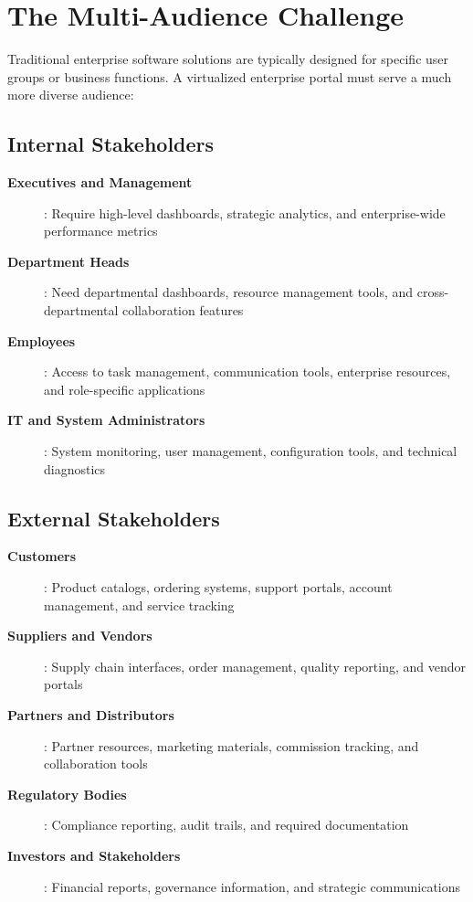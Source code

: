\section{The Multi-Audience Challenge}
\label{sec:multi-audience}

Traditional enterprise software solutions are typically designed for specific user groups or business functions. A virtualized enterprise portal must serve a much more diverse audience:

\subsection{Internal Stakeholders}

\begin{description}
\item[\textbf{Executives and Management}]: Require high-level dashboards, strategic analytics, and enterprise-wide performance metrics
\item[\textbf{Department Heads}]: Need departmental dashboards, resource management tools, and cross-departmental collaboration features
\item[\textbf{Employees}]: Access to task management, communication tools, enterprise resources, and role-specific applications
\item[\textbf{IT and System Administrators}]: System monitoring, user management, configuration tools, and technical diagnostics
\end{description}

\subsection{External Stakeholders}

\begin{description}
\item[\textbf{Customers}]: Product catalogs, ordering systems, support portals, account management, and service tracking
\item[\textbf{Suppliers and Vendors}]: Supply chain interfaces, order management, quality reporting, and vendor portals
\item[\textbf{Partners and Distributors}]: Partner resources, marketing materials, commission tracking, and collaboration tools
\item[\textbf{Regulatory Bodies}]: Compliance reporting, audit trails, and required documentation
\item[\textbf{Investors and Stakeholders}]: Financial reports, governance information, and strategic communications
\end{description}

